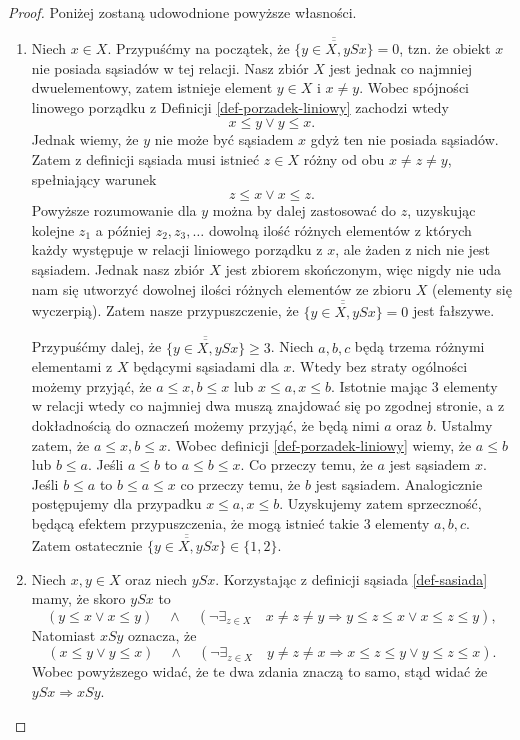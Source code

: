 \documentclass[12pt,a4paper]{report}
\newcommand{\licznosc}[1]{\overline{\overline{#1}}}
\begin{document}
\begin{proof}
Poniżej zostaną udowodnione powyższe własności.
\begin{enumerate}
\item Niech $x \in X$. Przypuśćmy na początek, że $\licznosc{\{y \in X, ySx\}} = 0$, tzn. że obiekt $x$ nie posiada sąsiadów w tej relacji. Nasz zbiór $X$ jest jednak co najmniej dwuelementowy, zatem istnieje element $y \in X$ i $ x \neq y$. Wobec spójności linowego porządku z Definicji \ref{def-porzadek-liniowy} zachodzi wtedy
$$ x \leq y \lor y \leq x.$$
Jednak wiemy, że $y$ nie może być sąsiadem $x$ gdyż ten nie posiada sąsiadów. Zatem z definicji sąsiada musi istnieć $z \in X$ różny od obu $x \neq z \neq y$, spełniający warunek
$$
z \leq x \lor x \leq z.
$$
Powyższe rozumowanie dla $y$ można by dalej zastosować do $z$, uzyskując kolejne $z_1$ a później $z_2,z_3, \ldots$ dowolną ilość różnych elementów z których każdy występuje w relacji liniowego porządku z $x$, ale żaden z nich nie jest sąsiadem. Jednak nasz zbiór $X$ jest zbiorem skończonym, więc nigdy nie uda nam się utworzyć dowolnej ilości różnych elementów ze zbioru $X$ (elementy się wyczerpią). Zatem nasze przypuszczenie, że $\licznosc{\{y \in X, ySx\}} = 0$ jest fałszywe.

Przypuśćmy dalej, że $\licznosc{\{y \in X, ySx\}} \geq 3$. Niech $a,b,c$ będą trzema różnymi elementami z $X$ będącymi sąsiadami dla $x$. Wtedy bez straty ogólności możemy przyjąć, że $a \leq x, b \leq x$ lub $x \leq a, x \leq b$. Istotnie mając 3 elementy w relacji wtedy co najmniej dwa muszą znajdować się po zgodnej stronie, a z dokładnością do oznaczeń możemy przyjąć, że będą nimi $a$ oraz $b$. Ustalmy zatem, że $a \leq x, b \leq x$. Wobec definicji \ref{def-porzadek-liniowy} wiemy, że $a \leq b$ lub $b \leq a$. Jeśli $a \leq b$ to $a \leq b \leq x$. Co przeczy temu, że $a$ jest sąsiadem $x$. Jeśli $b \leq a$ to $b \leq a \leq x$ co przeczy temu, że $b$ jest sąsiadem. Analogicznie postępujemy dla przypadku $x \leq a, x \leq b$. Uzyskujemy zatem sprzeczność, będącą efektem przypuszczenia, że mogą istnieć takie 3 elementy $a,b,c$. Zatem ostatecznie $\licznosc{\{y \in X, ySx\}} \in \{ 1,2 \}$.

\item Niech $x,y \in X$ oraz niech $ySx$. Korzystając z definicji sąsiada \ref{def-sasiada} mamy, że skoro $ySx$ to  $$\left(y \leq x \lor x\leq y \right)\quad \land \quad  \left(\lnot \exists_{z \in X}  \quad x\neq z \neq y \Rightarrow   y \leq z \leq x \lor x \leq z \leq y \right),$$ Natomiast $xSy$ oznacza, że $$\left(x \leq y \lor y\leq x \right)\quad \land \quad  \left(\lnot \exists_{z \in X}  \quad y\neq z \neq x \Rightarrow   x \leq z \leq y \lor y \leq z \leq x \right).$$ 
Wobec powyższego widać, że te dwa zdania znaczą to samo, stąd widać że  $ySx \Rightarrow xSy$. %


\end{enumerate}
\end{proof}
\end{document}
